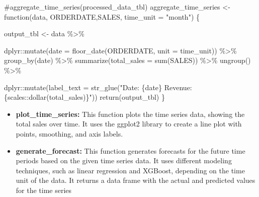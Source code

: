 \documentclass[
  11pt,
]{article}
\newenvironment{Shaded}{\begin{snugshade}}{\end{snugshade}}
\newcommand{\AttributeTok}[1]{\textcolor[rgb]{0.40,0.45,0.13}{#1}}
\newcommand{\CommentTok}[1]{\textcolor[rgb]{0.37,0.37,0.37}{#1}}
\newcommand{\ControlFlowTok}[1]{\textcolor[rgb]{0.00,0.23,0.31}{#1}}
\newcommand{\FunctionTok}[1]{\textcolor[rgb]{0.28,0.35,0.67}{#1}}
\newcommand{\NormalTok}[1]{\textcolor[rgb]{0.00,0.23,0.31}{#1}}
\newcommand{\OtherTok}[1]{\textcolor[rgb]{0.00,0.23,0.31}{#1}}
\newcommand{\SpecialCharTok}[1]{\textcolor[rgb]{0.37,0.37,0.37}{#1}}
\newcommand{\StringTok}[1]{\textcolor[rgb]{0.13,0.47,0.30}{#1}}
\begin{document}
\begin{Shaded}
\begin{Highlighting}[]
\CommentTok{\#aggregate\_time\_series(processed\_data\_tbl)}
\NormalTok{aggregate\_time\_series }\OtherTok{\textless{}{-}}
  \ControlFlowTok{function}\NormalTok{(data, ORDERDATE,SALES, }\AttributeTok{time\_unit =} \StringTok{"month"}\NormalTok{) \{}

\NormalTok{    output\_tbl }\OtherTok{\textless{}{-}}\NormalTok{ data }\SpecialCharTok{\%\textgreater{}\%}

\NormalTok{      dplyr}\SpecialCharTok{::}\FunctionTok{mutate}\NormalTok{(}\AttributeTok{date =} \FunctionTok{floor\_date}\NormalTok{(ORDERDATE, }\AttributeTok{unit =}\NormalTok{ time\_unit)) }\SpecialCharTok{\%\textgreater{}\%}
      \FunctionTok{group\_by}\NormalTok{(date) }\SpecialCharTok{\%\textgreater{}\%}
      \FunctionTok{summarize}\NormalTok{(}\AttributeTok{total\_sales =} \FunctionTok{sum}\NormalTok{(SALES)) }\SpecialCharTok{\%\textgreater{}\%}
      \FunctionTok{ungroup}\NormalTok{() }\SpecialCharTok{\%\textgreater{}\%}

\NormalTok{      dplyr}\SpecialCharTok{::}\FunctionTok{mutate}\NormalTok{(}\AttributeTok{label\_text =} \FunctionTok{str\_glue}\NormalTok{(}\StringTok{"Date: \{date\}}
\StringTok{                                 Revenue: \{scales::dollar(total\_sales)\}"}\NormalTok{))}
    \FunctionTok{return}\NormalTok{(output\_tbl)}
\NormalTok{  \}}
\end{Highlighting}
\end{Shaded}

\begin{itemize}
\item
  \textbf{plot\_time\_series:} This function plots the time series data,
  showing the total sales over time. It uses the ggplot2 library to
  create a line plot with points, smoothing, and axis labels.
\item
  \textbf{generate\_forecast:} This function generates forecasts for the
  future time periods based on the given time series data. It uses
  different modeling techniques, such as linear regression and XGBoost,
  depending on the time unit of the data. It returns a data frame with
  the actual and predicted values for the time series
\end{itemize}
\end{document}
